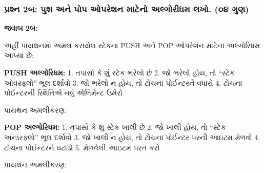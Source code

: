 \hypertarget{uxaaauxab0uxab6uxaa8-2uxaac-uxaaauxab6-uxa85uxaa8-uxaaauxaaa-uxa93uxaaauxab0uxab6uxaa8-uxaaeuxa9fuxaa8-uxa85uxab2uxa97uxab0uxaa7uxaae-uxab2uxa96.-uxae6uxaea-uxa97uxaa3}{%
\subsubsection{પ્રશ્ન 2બ: પુશ અને પોપ ઓપરેશન માટેનો અલ્ગોરીધમ લખો. (૦૪
ગુણ)}\label{uxaaauxab0uxab6uxaa8-2uxaac-uxaaauxab6-uxa85uxaa8-uxaaauxaaa-uxa93uxaaauxab0uxab6uxaa8-uxaaeuxa9fuxaa8-uxa85uxab2uxa97uxab0uxaa7uxaae-uxab2uxa96.-uxae6uxaea-uxa97uxaa3}}

\textbf{જવાબ 2બ:}

અહીં પાયથનમાં અમલ કરાયેલ સ્ટેકના PUSH અને POP ઓપરેશન માટેના અલ્ગોરિધમ આપ્યા છે:

\textbf{PUSH અલ્ગોરિધમ:} 1. તપાસો કે શું સ્ટેક ભરેલો છે 2. જો ભરેલો હોય, તો ``સ્ટેક
ઓવરફ્લો'' ભૂલ દર્શાવો 3. જો ભરેલો ન હોય, તો ટોચના પોઈન્ટરને વધારો 4. ટોચના
પોઈન્ટરની સ્થિતિએ નવું એલિમેન્ટ ઉમેરો

પાયથન અમલીકરણ:

\begin{Shaded}
\begin{Highlighting}[]
     \OperatorTok{\textgreater{}=}
        \NormalTok{(}
    \NormalTok{:}
        \NormalTok{(}
\end{Highlighting}
\end{Shaded}

\textbf{POP અલ્ગોરિધમ:} 1. તપાસો કે શું સ્ટેક ખાલી છે 2. જો ખાલી હોય, તો ``સ્ટેક
અન્ડરફ્લો'' ભૂલ દર્શાવો 3. જો ખાલી ન હોય, તો ટોચના પોઈન્ટર પરની આઇટમ મેળવો 4.
ટોચના પોઈન્ટરને ઘટાડો 5. મેળવેલી આઇટમ પરત કરો

પાયથન અમલીકરણ:

\begin{Shaded}
\begin{Highlighting}[]
     \OperatorTok{==} \NormalTok{:}
        \NormalTok{(}\NormalTok{)}
         
    \NormalTok{:}
\OperatorTok{=}
        \NormalTok{(}
\end{Highlighting}
\end{Shaded}

